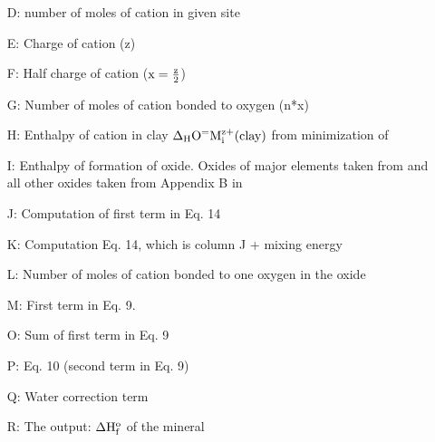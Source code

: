 \documentclass[12pt]{article} %
\numberwithin{equation}{section}
\numberwithin{table}{section}
\numberwithin{figure}{section}
\begin{document}
\begin{itemize}
\item[D:]  number of moles of cation in given site
\item[E:] Charge of cation (z)
\item[F:] Half charge of cation ($\rm x = \frac{z}{2}$)
\item[G:] Number of moles of cation bonded to oxygen (n*x)
\item[H:] Enthalpy of cation in clay $\rm \Delta_HO^=M_i^{z+}(clay)$ from minimization of \cite{Blanc2015} 
\item[I:] Enthalpy of formation of oxide. Oxides of major elements taken from \cite{Blanc2015} and all other oxides taken from Appendix B in \cite{Faure1998}
\item[J:] Computation of first term in Eq. 14
\item[K:] Computation Eq. 14, which is column J + mixing energy
\item[L:] Number of moles of cation bonded to one oxygen in the oxide 
\item[M:] First term in Eq. 9. 
\item[O:] Sum of first term in Eq. 9
\item[P:] Eq. 10 (second term in Eq. 9)
\item[Q:] Water correction term
\item[R:] The output: $\rm \Delta H_f^o$ of the mineral
\end{itemize}



\end{document}
